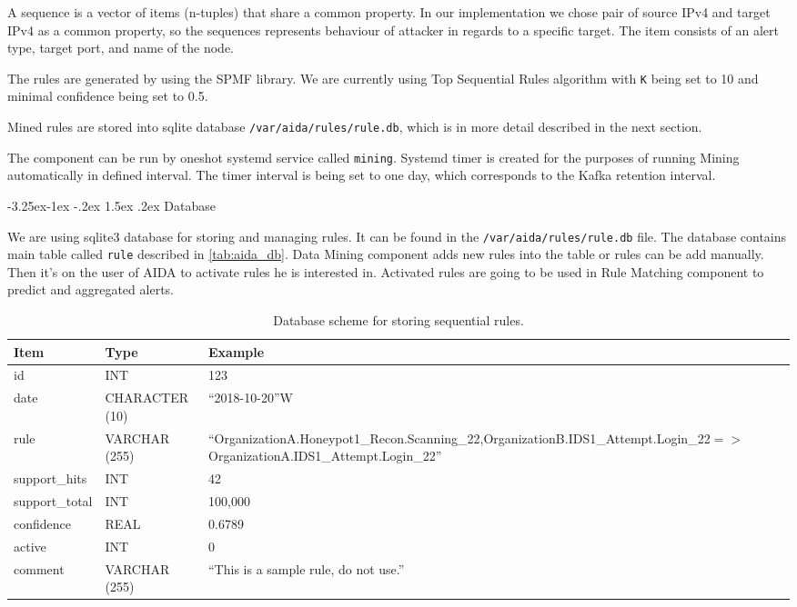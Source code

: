 \documentclass[a4paper]{article} %
\makeatletter
\renewcommand\subsection{\@startsection{subsection}{2}{\z@}%
                   {-3.25ex\@plus -1ex \@minus -.2ex}%
                   {1.5ex \@plus .2ex}%
                   {\normalfont\sffamily\large\bfseries\color{projectcolor}}}
\makeatother
\begin{document}
A sequence is a vector of items (n-tuples) that share a common property. In our implementation we chose pair of source IPv4 and target IPv4 as a common property, so the sequences represents behaviour of attacker in regards to a specific target. The item consists of an alert type, target port, and name of the node.

The rules are generated by using the SPMF library. We are currently using Top Sequential Rules algorithm with \texttt{K} being set to 10 and minimal confidence being set to 0.5.

Mined rules are stored into sqlite database \texttt{/var/aida/rules/rule.db}, which is in more detail described in the next section.

The component can be run by oneshot systemd service called \texttt{mining}. Systemd timer is created for the purposes of running Mining automatically in defined interval. The timer interval is being set to one day, which corresponds to the Kafka retention interval.


\subsection{Database}

We are using sqlite3 database for storing and managing rules. It can be found in the \texttt{/var/aida/rules/rule.db} file. The database contains main table called \texttt{rule} described in \autoref{tab:aida_db}. Data Mining component adds new rules into the table or rules can be add manually. Then it's on the user of AIDA to activate rules he is interested in. Activated rules are going to be used in Rule Matching component to predict and aggregated alerts.

\begin{table}[h]
\centering
\caption{Database scheme for storing sequential rules.}
\label{tab:aida_db}
\begin{tabular}{| l | l | m{9cm} |}
\hline
\rowcolor{gray!15}\textbf{Item} & \textbf{Type} & \textbf{Example} \\
\hline \hline
id             & INT            & 123        \\ \hline
date           & CHARACTER (10) & ``2018-10-20''W \\ \hline
rule           & VARCHAR (255)  & ``OrganizationA.Honeypot1\_Recon.Scanning\_22,\newline OrganizationB.IDS1\_Attempt.Login\_22\newline $=>$ OrganizationA.IDS1\_Attempt.Login\_22'' \\ \hline
support\_hits  & INT            & 42      \\ \hline
support\_total & INT            & 100,000 \\ \hline
confidence     & REAL           & 0.6789  \\ \hline
active         & INT            & 0       \\ \hline
comment        & VARCHAR (255)  & ``This is a sample rule, do not use.'' \\ \hline
\end{tabular}
\end{table}
\end{document}
